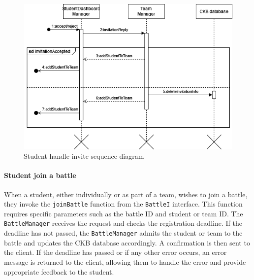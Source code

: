 \begin{figure}[H]
    \begin{center}
        \includegraphics[width=\linewidth]{Images/sequence/Sd_invitationHandle.png}
        \caption{Student handle invite sequence diagram}
        \label{fig:student_handle_invite}
    \end{center}
\end{figure}

\paragraph{Student join a battle}
When a student, either individually or as part of a team, wishes to join a battle, they invoke the \verb|joinBattle| function from the \verb|BattleI| interface. This function requires specific parameters such as the battle ID and student or team ID. 
The \verb|BattleManager| receives the request and checks the registration deadline. If the deadline has not passed, the \verb|BattleManager| admits the student or team to the battle and updates the CKB database accordingly. A confirmation is then sent to the client. 
If the deadline has passed or if any other error occurs, an error message is returned to the client, allowing them to handle the error and provide appropriate feedback to the student.

